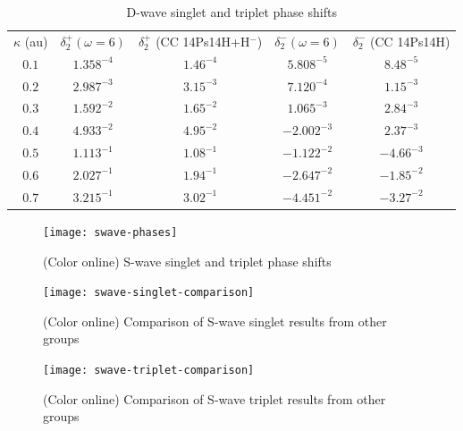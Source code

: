 \documentclass[preprint,showpacs,preprintnumbers,amsmath,amssymb]{revtex4}
\begin{document}
\begin{table}[H]
\begin{center}
\begin{ruledtabular}
\begin{tabular}{c c c c c}
$\kappa$ (au) & $\delta_2^+ (\omega = 6)$ & $\delta_2^+$ (CC 14Ps14H+H$^-$) \cite{Walters2004} & $\delta_2^- (\omega = 6)$ & $\delta_2^-$ (CC 14Ps14H) \cite{Blackwood2002} \\
\colrule
$0.1$ & $1.358^{-4}$ & $1.46^{-4}$ & $5.808^{-5}$ & $8.48^{-5}$ \\
$0.2$ & $2.987^{-3}$ & $3.15^{-3}$ & $7.120^{-4}$ & $1.15^{-3}$ \\
$0.3$ & $1.592^{-2}$ & $1.65^{-2}$ & $1.065^{-3}$ & $2.84^{-3}$ \\
$0.4$ & $4.933^{-2}$ & $4.95^{-2}$ & $-2.002^{-3}$ & $2.37^{-3}$ \\
$0.5$ & $1.113^{-1}$ & $1.08^{-1}$ & $-1.122^{-2}$ & $-4.66^{-3}$ \\
$0.6$ & $2.027^{-1}$ & $1.94^{-1}$ & $-2.647^{-2}$ & $-1.85^{-2}$ \\
$0.7$ & $3.215^{-1}$ & $3.02^{-1}$ & $-4.451^{-2}$ & $-3.27^{-2}$ \\
\end{tabular}
\end{ruledtabular}
\caption{D-wave singlet and triplet phase shifts}
\label{tab:DWavePhase}
\end{center}
\end{table}


\begin{figure}[ht]
	\centering
	\texttt{[image: swave-phases]}
	\caption{(Color online) S-wave singlet and triplet phase shifts}
	\label{fig:swave-phases}
\end{figure}

\begin{figure}[H]
	\centering
	\texttt{[image: swave-singlet-comparison]}
	\caption{(Color online) Comparison of S-wave singlet results from other groups}
	\label{fig:SwaveSingletComparison}
\end{figure}

\begin{figure}[H]
	\centering
	\texttt{[image: swave-triplet-comparison]}
	\caption{(Color online) Comparison of S-wave triplet results from other groups}
	\label{fig:SwaveTripletComparison}
\end{figure}
\end{document}
